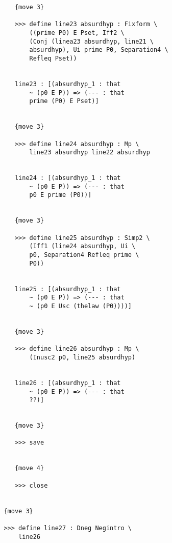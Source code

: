 \documentclass[12pt]{article}
\begin{document}
\begin{verbatim}
            {move 3}

            >>> define line23 absurdhyp : Fixform \
                ((prime P0) E Pset, Iff2 \
                (Conj (linea23 absurdhyp, line21 \
                absurdhyp), Ui prime P0, Separation4 \
                Refleq Pset))


            line23 : [(absurdhyp_1 : that 
                ~ (p0 E P)) => (--- : that 
                prime (P0) E Pset)]


            {move 3}

            >>> define line24 absurdhyp : Mp \
                line23 absurdhyp line22 absurdhyp


            line24 : [(absurdhyp_1 : that 
                ~ (p0 E P)) => (--- : that 
                p0 E prime (P0))]


            {move 3}

            >>> define line25 absurdhyp : Simp2 \
                (Iff1 (line24 absurdhyp, Ui \
                p0, Separation4 Refleq prime \
                P0))


            line25 : [(absurdhyp_1 : that 
                ~ (p0 E P)) => (--- : that 
                ~ (p0 E Usc (thelaw (P0))))]


            {move 3}

            >>> define line26 absurdhyp : Mp \
                (Inusc2 p0, line25 absurdhyp)


            line26 : [(absurdhyp_1 : that 
                ~ (p0 E P)) => (--- : that 
                ??)]


            {move 3}

            >>> save


            {move 4}

            >>> close


         {move 3}

         >>> define line27 : Dneg Negintro \
             line26



\end{verbatim}
\end{document}
